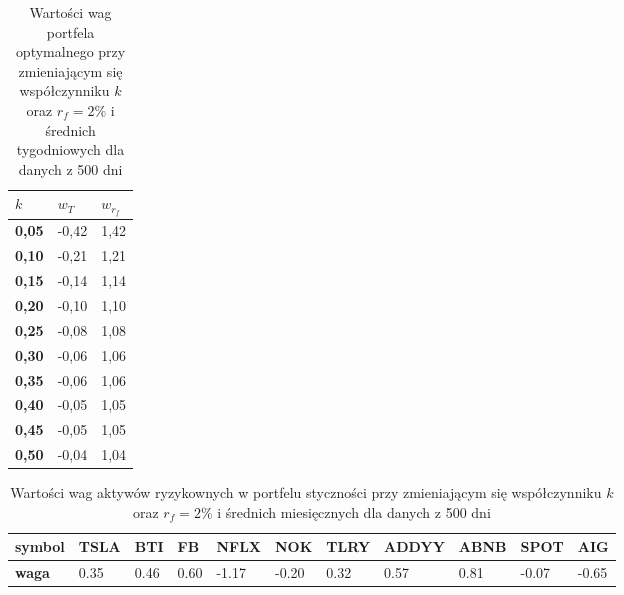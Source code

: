 \documentclass[magister]{dyplom}
\begin{document}
\begin{table}[ht]
	\centering
	\caption{Wartości wag portfela optymalnego przy zmieniającym się współczynniku $k$ oraz $r_f = 2\%$ i średnich tygodniowych dla danych z 500 dni}
	\begin{tabular}{|l|l|l|}
		\hline
		\textbf{$k$} & \textbf{$w_T$} & \textbf{$w_{r_f}$} \\ \hline
		\textbf{0,05}                                             & -0,42         & 1,42           \\ \hline
		\textbf{0,10}                                             & -0,21         & 1,21           \\ \hline
		\textbf{0,15}                                             & -0,14         & 1,14           \\ \hline
		\textbf{0,20}                                             & -0,10         & 1,10           \\ \hline
		\textbf{0,25}                                             & -0,08         & 1,08           \\ \hline
		\textbf{0,30}                                             & -0,06         & 1,06           \\ \hline
		\textbf{0,35}                                             & -0,06         & 1,06           \\ \hline
		\textbf{0,40}                                             & -0,05         & 1,05           \\ \hline
		\textbf{0,45}                                             & -0,05         & 1,05           \\ \hline
		\textbf{0,50}                                             & -0,04         & 1,04           \\ \hline
	\end{tabular}
\end{table}
\begin{table}[ht]
	\centering
	\caption{Wartości wag aktywów ryzykownych w portfelu styczności przy zmieniającym się współczynniku $k$ oraz $r_f = 2\%$ i średnich miesięcznych dla danych z 500 dni}
	\begin{tabular}{|l|l|l|l|l|l|l|l|l|l|l|}
		\hline
		\textbf{symbol} & \textbf{TSLA} & \textbf{BTI} & \textbf{FB} & \textbf{NFLX} & \textbf{NOK} & \textbf{TLRY} & \textbf{ADDYY} & \textbf{ABNB} & \textbf{SPOT} & \textbf{AIG} \\ \hline
		\textbf{waga}   & 0.35       & 0.46          & 0.60           & -1.17        & -0.20         & 0.32         & 0.57        & 0.81          & -0.07          & -0.65        \\ \hline
	\end{tabular}
\end{table}
\end{document}
